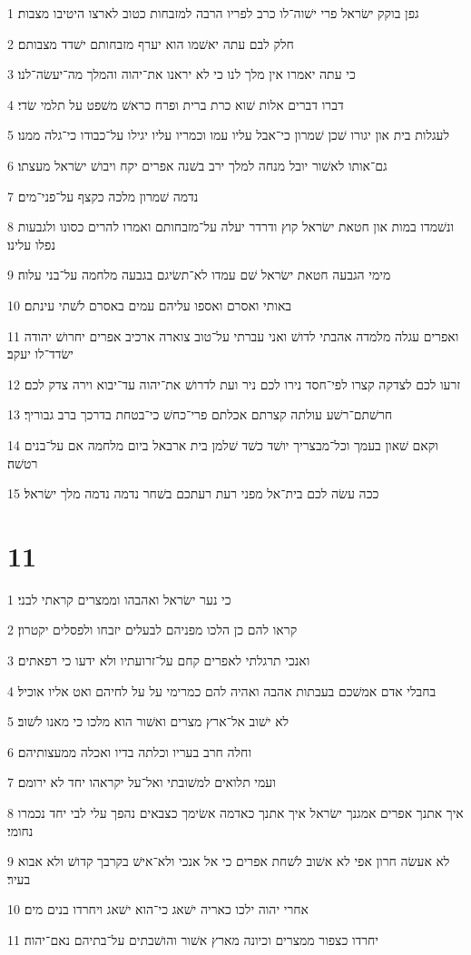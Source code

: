 \par 1 גפן בוקק ישׂראל פרי ישׁוה־לו כרב לפריו הרבה למזבחות כטוב לארצו היטיבו מצבות׃
\par 2 חלק לבם עתה יאשׁמו הוא יערף מזבחותם ישׁדד מצבותם׃
\par 3 כי עתה יאמרו אין מלך לנו כי לא יראנו את־יהוה והמלך מה־יעשׂה־לנו׃
\par 4 דברו דברים אלות שׁוא כרת ברית ופרח כראשׁ משׁפט על תלמי שׂדי׃
\par 5 לעגלות בית און יגורו שׁכן שׁמרון כי־אבל עליו עמו וכמריו עליו יגילו על־כבודו כי־גלה ממנו׃
\par 6 גם־אותו לאשׁור יובל מנחה למלך ירב בשׁנה אפרים יקח ויבושׁ ישׂראל מעצתו׃
\par 7 נדמה שׁמרון מלכה כקצף על־פני־מים׃
\par 8 ונשׁמדו במות און חטאת ישׂראל קוץ ודרדר יעלה על־מזבחותם ואמרו להרים כסונו ולגבעות נפלו עלינו׃
\par 9 מימי הגבעה חטאת ישׂראל שׁם עמדו לא־תשׂיגם בגבעה מלחמה על־בני עלוה׃
\par 10 באותי ואסרם ואספו עליהם עמים באסרם לשׁתי עינתם׃
\par 11 ואפרים עגלה מלמדה אהבתי לדושׁ ואני עברתי על־טוב צוארה ארכיב אפרים יחרושׁ יהודה ישׂדד־לו יעקב׃
\par 12 זרעו לכם לצדקה קצרו לפי־חסד נירו לכם ניר ועת לדרושׁ את־יהוה עד־יבוא וירה צדק לכם׃
\par 13 חרשׁתם־רשׁע עולתה קצרתם אכלתם פרי־כחשׁ כי־בטחת בדרכך ברב גבוריך׃
\par 14 וקאם שׁאון בעמך וכל־מבצריך יושׁד כשׁד שׁלמן בית ארבאל ביום מלחמה אם על־בנים רטשׁה׃
\par 15 ככה עשׂה לכם בית־אל מפני רעת רעתכם בשׁחר נדמה נדמה מלך ישׂראל׃

\chapter{11}

\par 1 כי נער ישׂראל ואהבהו וממצרים קראתי לבני׃
\par 2 קראו להם כן הלכו מפניהם לבעלים יזבחו ולפסלים יקטרון׃
\par 3 ואנכי תרגלתי לאפרים קחם על־זרועתיו ולא ידעו כי רפאתים׃
\par 4 בחבלי אדם אמשׁכם בעבתות אהבה ואהיה להם כמרימי על על לחיהם ואט אליו אוכיל׃
\par 5 לא ישׁוב אל־ארץ מצרים ואשׁור הוא מלכו כי מאנו לשׁוב׃
\par 6 וחלה חרב בעריו וכלתה בדיו ואכלה ממעצותיהם׃
\par 7 ועמי תלואים למשׁובתי ואל־על יקראהו יחד לא ירומם׃
\par 8 איך אתנך אפרים אמגנך ישׂראל איך אתנך כאדמה אשׂימך כצבאים נהפך עלי לבי יחד נכמרו נחומי׃
\par 9 לא אעשׂה חרון אפי לא אשׁוב לשׁחת אפרים כי אל אנכי ולא־אישׁ בקרבך קדושׁ ולא אבוא בעיר׃
\par 10 אחרי יהוה ילכו כאריה ישׁאג כי־הוא ישׁאג ויחרדו בנים מים׃
\par 11 יחרדו כצפור ממצרים וכיונה מארץ אשׁור והושׁבתים על־בתיהם נאם־יהוה׃

